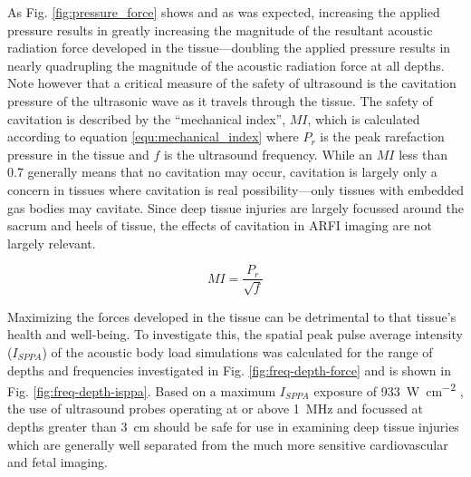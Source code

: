 			As Fig. \ref{fig:pressure_force} shows and as was expected, increasing the applied pressure results in greatly increasing the magnitude of the resultant acoustic radiation force developed in the tissue---doubling the applied pressure results in nearly quadrupling the magnitude of the acoustic radiation force at all depths. Note however that a critical measure of the safety of ultrasound is the cavitation pressure of the ultrasonic wave as it travels through the tissue. The safety of cavitation is described by the ``mechanical index'', $MI$, which is calculated according to equation \ref{equ:mechanical_index} \cite{hoskins10} where $P_r$ is the peak rarefaction pressure in the tissue and $f$ is the ultrasound frequency. While an $MI$ less than 0.7 generally means that no cavitation may occur, cavitation is largely only a concern in tissues where cavitation is real possibility---only tissues with embedded gas bodies may cavitate. Since deep tissue injuries are largely focussed around the sacrum and heels of tissue, the effects of cavitation in ARFI imaging are not largely relevant.

			\begin{equation}
			\label{equ:mechanical_index}
				MI = \frac{P_r}{\sqrt{f}}
			\end{equation}

			Maximizing the forces developed in the tissue can be detrimental to that tissue's health and well-being. To investigate this, the spatial peak pulse average intensity ($I_{SPPA}$) of the acoustic body load simulations was calculated for the range of depths and frequencies investigated in Fig. \ref{fig:freq-depth-force} and is shown in Fig. \ref{fig:freq-depth-isppa}. Based on a maximum $I_{SPPA}$ exposure of \SI{933}{\W\per\cm\squared} \cite{hoskins10}, the use of ultrasound probes operating at or above \SI{1}{\MHz} and focussed at depths greater than \SI{3}{\cm} should be safe for use in examining deep tissue injuries which are generally well separated from the much more sensitive cardiovascular and fetal imaging.

